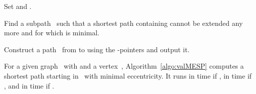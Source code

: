\documentclass[10pt]{llncs}
\begin{document}
\begin{algorithm}
{{        \ForEach
        {
            
            \label{line:QiLoop}
        }
        {
            
            \label{line:compEpsilonPrime}

            \If
            {
                
                \label{line:comareEpsilon}
            }
            {
                Set  and .
                \label{line:setP}
            }
        }
    }
}

Find a subpath~ such that a shortest path containing  cannot be extended any more and for which  is minimal.
\label{line:findMinQj}

Construct a path~ from  to  using the -pointers and output it.
\label{line:constructP}
\end{algorithm}

\begin{theorem}
For a given graph~ with  and a vertex~, Algorithm~\ref{algo:valMESP} computes a shortest path starting in~ with minimal eccentricity.
It runs in  time if , in  time if , and in  time if .
\end{theorem}
\end{document}
